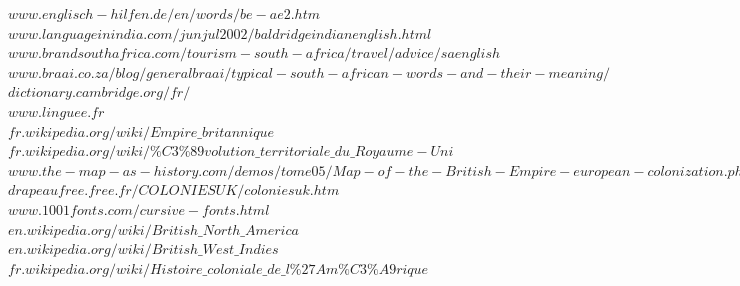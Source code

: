 \documentclass[11pt, a4paper]{report}
\begin{document}
$www.englisch-hilfen.de/en/words/be-ae2.htm$\\

$www.languageinindia.com/junjul2002/baldridgeindianenglish.html$\\

$www.brandsouthafrica.com/tourism-south-africa/travel/advice/saenglish$\\

$www.braai.co.za/blog/generalbraai/typical-south-african-words-and-their-meaning/$\\

$dictionary.cambridge.org/fr/$\\

$www.linguee.fr$\\

$fr.wikipedia.org/wiki/Empire\_britannique$\\

$fr.wikipedia.org/wiki/\%C3\%89volution\_territoriale\_du\_Royaume-Uni$\\

$www.the-map-as-history.com/demos/tome05/Map-of-the-British-Empire-european-colonization.php$\\

$drapeaufree.free.fr/COLONIESUK/coloniesuk.htm$\\

$www.1001fonts.com/cursive-fonts.html$\\

$en.wikipedia.org/wiki/British\_North\_America$\\

$en.wikipedia.org/wiki/British\_West\_Indies$\\

$fr.wikipedia.org/wiki/Histoire\_coloniale\_de\_l\%27Am\%C3\%A9rique$\\
\end{document}
